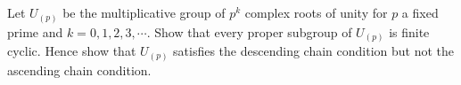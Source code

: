 Let $U_{(p)}$ be the multiplicative group of $p^k$ complex roots of unity for $p$ a fixed prime and $k = 0, 1, 2, 3, \cdots$. Show that every proper subgroup of $U_{(p)}$ is finite cyclic. Hence show that $U_{(p)}$ satisfies the descending chain condition but not the ascending chain condition.
